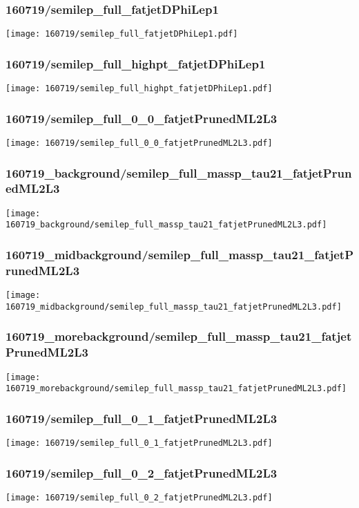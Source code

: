 \begin{frame}
   \frametitle{\small 160719/semilep\_full\_fatjetDPhiLep1}
   \centering
   \texttt{[image: 160719/semilep\_full\_fatjetDPhiLep1.pdf]}
\end{frame}

\begin{frame}
   \frametitle{\small 160719/semilep\_full\_highpt\_fatjetDPhiLep1}
   \centering
   \texttt{[image: 160719/semilep\_full\_highpt\_fatjetDPhiLep1.pdf]}
\end{frame}

\begin{frame}
   \frametitle{\small 160719/semilep\_full\_0\_0\_fatjetPrunedML2L3}
   \centering
   \texttt{[image: 160719/semilep\_full\_0\_0\_fatjetPrunedML2L3.pdf]}
\end{frame}

\begin{frame}
   \frametitle{\small 160719\_background/semilep\_full\_massp\_tau21\_fatjetPrunedML2L3}
   \centering
   \texttt{[image: 160719\_background/semilep\_full\_massp\_tau21\_fatjetPrunedML2L3.pdf]}
\end{frame}

\begin{frame}
   \frametitle{\small 160719\_midbackground/semilep\_full\_massp\_tau21\_fatjetPrunedML2L3}
   \centering
   \texttt{[image: 160719\_midbackground/semilep\_full\_massp\_tau21\_fatjetPrunedML2L3.pdf]}
\end{frame}

\begin{frame}
   \frametitle{\small 160719\_morebackground/semilep\_full\_massp\_tau21\_fatjetPrunedML2L3}
   \centering
   \texttt{[image: 160719\_morebackground/semilep\_full\_massp\_tau21\_fatjetPrunedML2L3.pdf]}
\end{frame}

\begin{frame}
   \frametitle{\small 160719/semilep\_full\_0\_1\_fatjetPrunedML2L3}
   \centering
   \texttt{[image: 160719/semilep\_full\_0\_1\_fatjetPrunedML2L3.pdf]}
\end{frame}

\begin{frame}
   \frametitle{\small 160719/semilep\_full\_0\_2\_fatjetPrunedML2L3}
   \centering
   \texttt{[image: 160719/semilep\_full\_0\_2\_fatjetPrunedML2L3.pdf]}
\end{frame}

